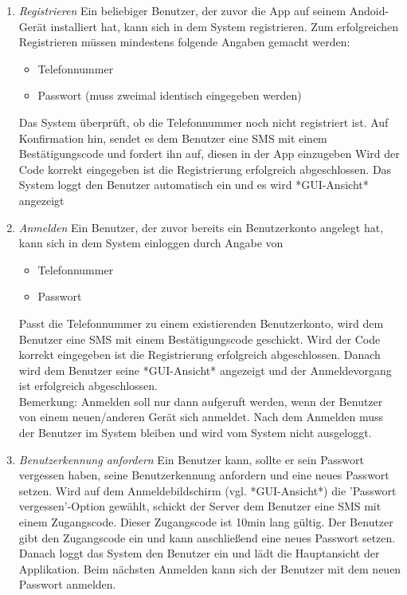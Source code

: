 \documentclass[parskip=full]{scrartcl}
\def\threedigits#1{%
  \ifnum#1<100 0\fi
  \ifnum#1<10 0\fi
  \number#1}
\begin{document}
\begin{enumerate}[label={\textbf{/F\protect\threedigits{\theenumi}0/}}, leftmargin=*]
	
	\item \textit{Registrieren} Ein beliebiger Benutzer, der zuvor die App auf seinem Andoid-Gerät installiert hat, kann sich in dem \gls{System} registrieren. Zum erfolgreichen Registrieren müssen mindestens folgende Angaben gemacht werden:
	\begin{itemize}
		\item Telefonnummer %
		\item Passwort (muss zweimal identisch eingegeben werden)
	\end{itemize}
	 Das \gls{System} überprüft, ob die Telefonnummer noch  nicht  registriert ist. Auf Konfirmation hin, sendet es dem Benutzer eine SMS %
	 mit einem Bestätigungscode und fordert ihn auf, diesen in der App einzugeben %
	 Wird der Code korrekt eingegeben ist die Registrierung erfolgreich abgeschlossen. Das System loggt den Benutzer automatisch ein und es wird *GUI-Ansicht* angezeigt %
	 	
	\item \textit{Anmelden} Ein Benutzer, der zuvor bereits ein Benutzerkonto angelegt hat, kann sich in dem System einloggen durch Angabe von
	\begin{itemize}
		\item Telefonnummer
		\item Passwort
	\end{itemize}
	Passt die Telefonnummer zu einem existierenden Benutzerkonto, wird dem Benutzer eine SMS mit einem Bestätigungscode geschickt. Wird der Code korrekt eingegeben ist die Registrierung erfolgreich abgeschlossen. Danach wird dem Benutzer seine *GUI-Ansicht* angezeigt und der Anmeldevorgang ist erfolgreich abgeschlossen.\\
Bemerkung: Anmelden soll nur dann aufgeruft werden, wenn der Benutzer von einem neuen/anderen Gerät sich anmeldet. Nach dem Anmelden muss der Benutzer im System bleiben und wird vom System nicht ausgeloggt.
	
	\item \textit{Benutzerkennung anfordern} Ein Benutzer kann, sollte er sein Passwort vergessen haben, seine Benutzerkennung anfordern und eine neues Passwort setzen. Wird auf dem Anmeldebildschirm (vgl. *GUI-Ansicht*) die 'Passwort vergessen'-Option gewählt, schickt der Server dem Benutzer eine SMS mit einem Zugangscode. Dieser Zugangscode ist 10min lang gültig. Der Benutzer gibt den Zugangscode ein und kann anschließend eine neues Passwort setzen. Danach loggt das System den Benutzer ein und lädt die Hauptansicht der Applikation. Beim nächsten Anmelden kann sich der Benutzer mit dem neuen Passwort anmelden.


\end{enumerate}
\end{document}
